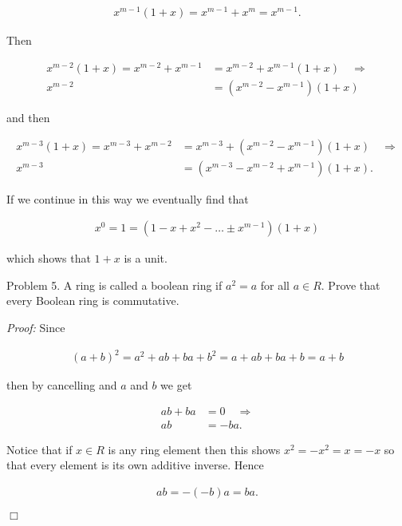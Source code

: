 \documentclass{article}
\begin{document}
  \begin{align*}
    x^{m-1}(1+x) = x^{m-1}+x^m=x^{m-1}.
  \end{align*}

  Then

  \begin{align*}
    x^{m-2}(1+x) =x^{m-2}+x^{m-1} &= x^{m-2}+x^{m-1}(1+x) \quad \Rightarrow\\
    x^{m-2} &= (x^{m-2}-x^{m-1})(1+x)
  \end{align*}

  and then

  \begin{align*}
    x^{m-3}(1+x) = x^{m-3}+x^{m-2} &= x^{m-3} + (x^{m-2}-x^{m-1})(1+x) \quad \Rightarrow \\
    x^{m-3} &= (x^{m-3}-x^{m-2}+x^{m-1})(1+x).
  \end{align*}

  If we continue in this way we eventually find that

  \begin{align*}
    x^0 = 1 = (1-x+x^2-\dots \pm x^{m-1})(1+x)
  \end{align*}

  which shows that $1+x$ is a unit.

  \pagebreak

  {\Large \color{Sepia} Problem 5.  A ring is called a boolean ring if $a^2=a$ for all $a\in R$.  Prove that every Boolean ring is commutative.}

  {\it Proof:} Since

  \begin{align*}
    (a+b)^2 = a^2 + ab + ba + b^2 = a+ab+ba+b = a+b
  \end{align*}

  then by cancelling and $a$ and $b$ we get

  \begin{align*}
    ab+ba &= 0 \quad \Rightarrow \\
    ab &= -ba.
  \end{align*}

  Notice that if $x\in R$ is any ring element then this shows $x^2 = -x^2 = x = -x$ so that every element is its own additive inverse.  Hence

  \begin{align*}
    ab = -(-b)a = ba.
  \end{align*}

  $\Box$

  \pagebreak
\end{document}
